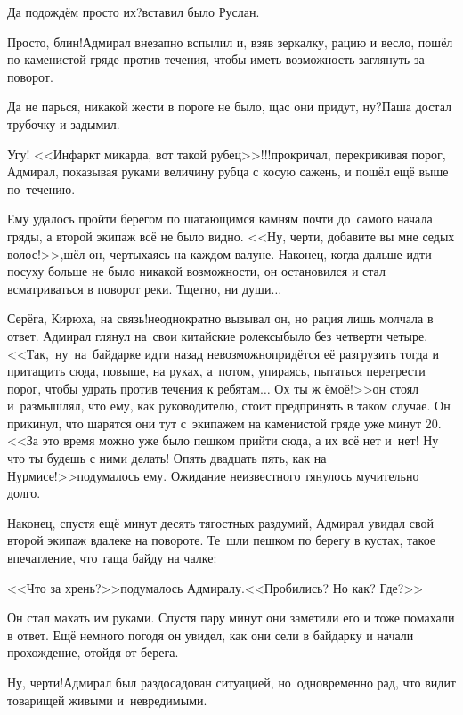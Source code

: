 \diagdash Да подождём просто их?\mdash вставил было Руслан.

\diagdash Просто, блин!\mdash Адмирал внезапно вспылил и, взяв зеркалку, рацию и весло, пошёл по каменистой гряде против течения, чтобы иметь возможность заглянуть за поворот.

\diagdash Да не парься, никакой жести в пороге не было, щас они придут, ну?\mdash Паша достал трубочку и задымил.

\diagdash Угу! <<Инфаркт микарда, вот такой рубец>>!!!\mdash прокричал, перекрикивая порог, Адмирал, показывая руками величину рубца с косую сажень, и пошёл ещё выше по~течению.

Ему удалось пройти берегом по шатающимся камням почти до~самого начала гряды, а второй экипаж всё не было видно. <<Ну, черти, добавите вы мне седых волос!>>,\mdash шёл он, чертыхаясь на каждом валуне. Наконец, когда дальше идти посуху больше не было никакой возможности, он остановился и стал всматриваться в поворот реки. Тщетно, ни души$\ldots$

\diagdash Серёга, Кирюха, на связь!\mdash неоднократно вызывал он, но рация лишь молчала в ответ. Адмирал глянул на~свои китайские ролексы\mdash было без четверти четыре. <<Так,~ну~на~байдарке идти назад невозможно\mdash придётся её разгрузить тогда и притащить сюда, повыше, на руках, а~потом, упираясь, пытаться перегрести порог, чтобы удрать против течения к ребятам$\ldots$ Ох ты ж ё\sdash моё!>>\mdash он стоял и~размышлял, что ему, как руководителю, стоит предпринять в таком случае. Он прикинул, что шарятся они тут с~экипажем на каменистой гряде уже минут 20. <<За это время можно уже было пешком прийти сюда, а их всё нет и~нет! Ну что ты будешь с ними делать! Опять двадцать пять, как на Нурмисе!>>\mdash подумалось ему. Ожидание неизвестного тянулось мучительно долго.

Наконец, спустя ещё минут десять тягостных раздумий, Адмирал увидал свой второй экипаж вдалеке на повороте. Те~шли пешком по берегу в кустах, такое впечатление, что таща байду на чалке: 

<<Что за хрень?>>\mdash подумалось Адмиралу.\mdash <<Пробились? Но как? Где?>>

Он стал махать им руками. Спустя пару минут они заметили его и тоже помахали в ответ. Ещё немного погодя он увидел, как они сели в байдарку и начали прохождение, отойдя от берега.

\diagdash Ну, черти!\mdash Адмирал был раздосадован ситуацией, но~одновременно рад, что видит товарищей живыми и~невредимыми.

